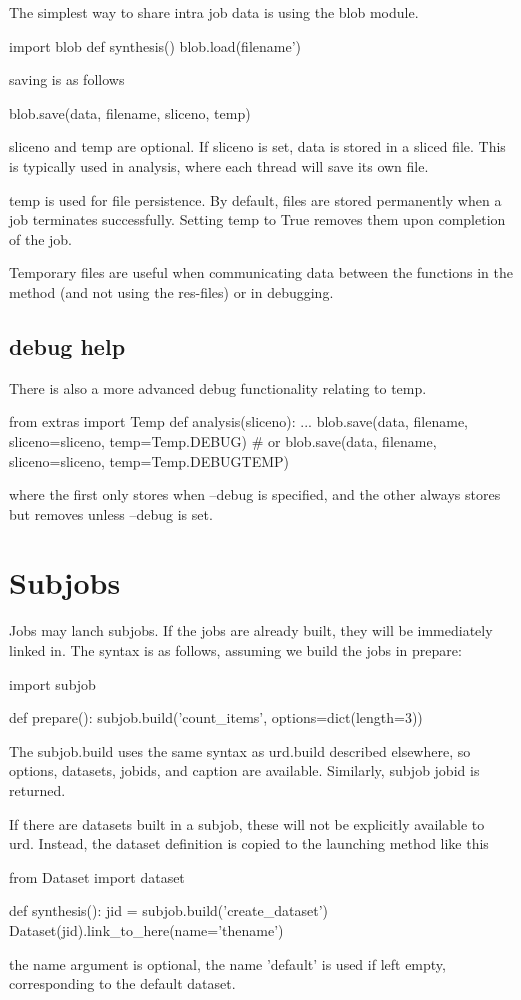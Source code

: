 The simplest way to share intra job data is using the blob module.

\begin{python}
import blob
def synthesis()
  blob.load(filename')
\end{python}

saving is as follows

\begin{python}
  blob.save(data, filename, sliceno, temp)
\end{python}
sliceno and temp are optional.  If sliceno is set, data is stored in a
sliced file.  This is typically used in analysis, where each thread
will save its own file.

temp is used for file persistence.  By default, files are stored
permanently when a job terminates successfully.  Setting temp to True
removes them upon completion of the job.

Temporary files are useful when communicating data between the
functions in the method (and not using the res-files) or in debugging.


\subsection{debug help}
There is also a more advanced debug functionality relating to temp.

\begin{python}
from extras import Temp
def analysis(sliceno):
  ...
  blob.save(data, filename, sliceno=sliceno, temp=Temp.DEBUG)
  # or
  blob.save(data, filename, sliceno=sliceno, temp=Temp.DEBUGTEMP)
\end{python}
where the first only stores when --debug is specified, and the other
always stores but removes unless --debug is set.


\newpage
\section{Subjobs}

Jobs may lanch subjobs.  If the jobs are already built, they will be
immediately linked in.  The syntax is as follows, assuming we build
the jobs in prepare:

\begin{python}
import subjob

def prepare():
  subjob.build('count_items', options=dict(length=3))
\end{python}
The subjob.build uses the same syntax as urd.build described
elsewhere, so options, datasets, jobids, and caption are available.
Similarly, subjob jobid is returned.

If there are datasets built in a subjob, these will not be explicitly
available to urd.  Instead, the dataset definition is copied to the
launching method like this

\begin{python}
from Dataset import dataset

def synthesis():
  jid = subjob.build('create_dataset')
  Dataset(jid).link_to_here(name='thename')
\end{python}
the name argument is optional, the name 'default' is used if left
empty, corresponding to the default dataset.
